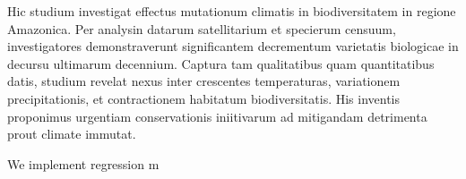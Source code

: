 Hic studium investigat effectus mutationum climatis in biodiversitatem in regione Amazonica. Per analysin datarum satellitarium et specierum censuum, investigatores demonstraverunt significantem decrementum varietatis biologicae in decursu ultimarum decennium. Captura tam qualitatibus quam quantitatibus datis, studium revelat nexus inter crescentes temperaturas, variationem precipitationis, et contractionem habitatum biodiversitatis. His inventis proponimus urgentiam conservationis iniitivarum ad mitigandam detrimenta prout climate immutat.

We implement regression m

